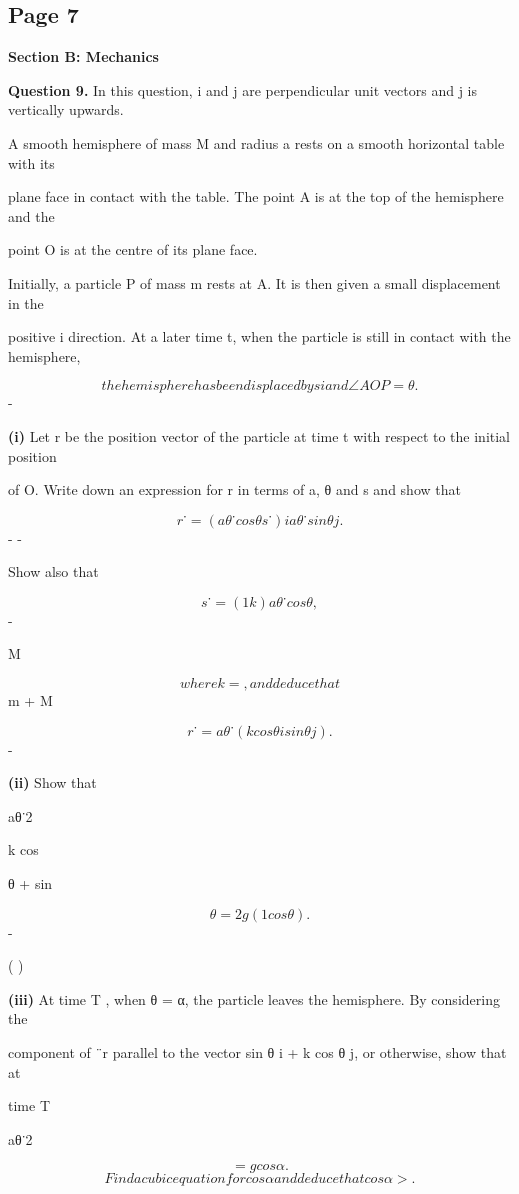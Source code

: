 \documentclass[12pt]{article}
\begin{document}
\subsection*{Page 7}
\begin{flushleft}
\bigskip\textbf{Section B: Mechanics}\par
\bigskip\textbf{Question 9.} In this question, i and j are perpendicular unit vectors and j is vertically upwards.\par
A smooth hemisphere of mass M and radius a rests on a smooth horizontal table with its\par
plane face in contact with the table. The point A is at the top of the hemisphere and the\par
point O is at the centre of its plane face.\par
Initially, a particle P of mass m rests at A. It is then given a small displacement in the\par
positive i direction. At a later time t, when the particle is still in contact with the hemisphere,\par
\[the hemisphere has been displaced by s i and ∠AOP = θ.\]
-\par
\textbf{(i)} Let r be the position vector of the particle at time t with respect to the initial position\par
of O. Write down an expression for r in terms of a, θ and s and show that\par
\[r˙ = (aθ˙ cos θ s˙) i aθ˙ sin θ j.\]
- -\par
Show also that\par
\[s˙ = (1 k) a θ˙ cos θ,\]
-\par
M\par
\[where k = , and deduce that\]
m + M\par
\[r˙ = aθ˙(k cos θ i sin θ j).\]
-\par
\textbf{(ii)} Show that\par
aθ˙2\par
k cos\par
θ + sin\par
\[θ = 2g(1 cos θ).\]
-\par
( )\par
\textbf{(iii)} At time T , when θ = α, the particle leaves the hemisphere. By considering the\par
component of ¨r parallel to the vector sin θ i + k cos θ j, or otherwise, show that at\par
time T\par
aθ˙2\par
\[= g cos α.\]
\[Find a cubic equation for cos α and deduce that cos α > .\]
\end{flushleft}
\end{document}
